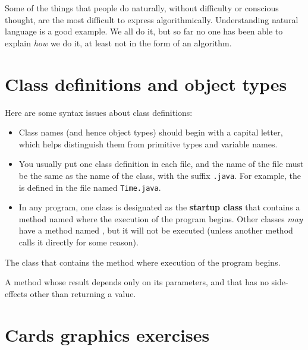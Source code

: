 Some of the things that people do naturally, without difficulty
or conscious thought, are the most difficult to express
algorithmically.  Understanding natural language is a good
example.  We all do it, but so far no one has been able to
explain {\em how} we do it, at least not in the form of an
algorithm.




\section{Class definitions and object types}

Here are some syntax issues about class definitions:

\begin{itemize}

\item Class names (and hence object types) should begin with a capital letter, which helps distinguish them from primitive types and variable names.

\item You usually put one class definition in each file, and the name of the file must be the same as the name of the class, with the suffix {\tt .java}.
For example, the  is defined in the file named {\tt Time.java}.

\item In any program, one class is designated as the {\bf startup class} that contains a method named  where the execution of the program begins.
Other classes {\em may} have a method named , but it will not be executed (unless another method calls it directly for some reason).

\end{itemize}

The class that contains the  method where execution of the program begins.

A method whose result depends only on its parameters, and that has no side-effects other than returning a value.


\section{Cards graphics exercises}

